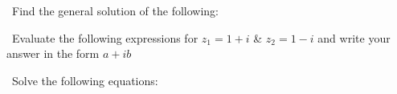 \documentclass[12pt]{exam}
\begin{document}
\begin{questions}

\question\ Find the general solution of the following: 


\question\ Evaluate the following expressions for \(z_1 = 1 + i\) \& \(z_2 = 1 - i\) and write your answer in the form \(a + i b\)

\question\ Solve the following equations: 
\begin{parts}
    \large

\end{parts}
\end{questions}
\end{document}
